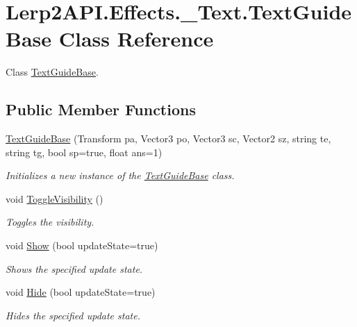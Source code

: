 \hypertarget{class_lerp2_a_p_i_1_1_effects_1_1___text_1_1_text_guide_base}{}\section{Lerp2\+A\+P\+I.\+Effects.\+\_\+\+Text.\+Text\+Guide\+Base Class Reference}
\label{class_lerp2_a_p_i_1_1_effects_1_1___text_1_1_text_guide_base}


Class \hyperlink{class_lerp2_a_p_i_1_1_effects_1_1___text_1_1_text_guide_base}{Text\+Guide\+Base}.  


\subsection*{Public Member Functions}
\begin{DoxyCompactItemize}
\item 
\hyperlink{class_lerp2_a_p_i_1_1_effects_1_1___text_1_1_text_guide_base_a25b5e41e89e95c3349225edf394b1c57}{Text\+Guide\+Base} (Transform pa, Vector3 po, Vector3 sc, Vector2 sz, string te, string tg, bool sp=true, float ans=1)
\begin{DoxyCompactList}\small\item\em Initializes a new instance of the \hyperlink{class_lerp2_a_p_i_1_1_effects_1_1___text_1_1_text_guide_base}{Text\+Guide\+Base} class. \end{DoxyCompactList}\item 
void \hyperlink{class_lerp2_a_p_i_1_1_effects_1_1___text_1_1_text_guide_base_ada9fddd6f49b24e87ba7cc2b37e39a09}{Toggle\+Visibility} ()
\begin{DoxyCompactList}\small\item\em Toggles the visibility. \end{DoxyCompactList}\item 
void \hyperlink{class_lerp2_a_p_i_1_1_effects_1_1___text_1_1_text_guide_base_a8182acefec9e14906b1eff6087c4f66a}{Show} (bool update\+State=true)
\begin{DoxyCompactList}\small\item\em Shows the specified update state. \end{DoxyCompactList}\item 
void \hyperlink{class_lerp2_a_p_i_1_1_effects_1_1___text_1_1_text_guide_base_ac71d661d24091d2a3e095497eb512ef0}{Hide} (bool update\+State=true)
\begin{DoxyCompactList}\small\item\em Hides the specified update state. \end{DoxyCompactList}\end{DoxyCompactItemize}
